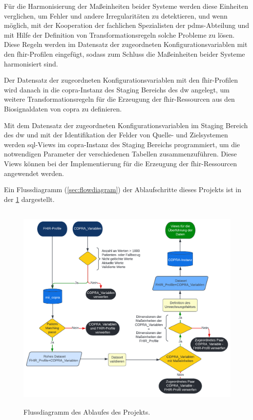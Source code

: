 Für die Harmonisierung der Maßeinheiten beider Systeme werden diese Einheiten verglichen, um Fehler und andere Irregularitäten zu detektieren, und wenn möglich, mit der Kooperation der fachlichen Spezialisten der \ac{pdms}-Abteilung und mit Hilfe der Definition von Transformationsregeln solche Probleme zu lösen. Diese Regeln werden im Datensatz der zugeordneten Konfigurationsvariablen mit den \ac{fhir}-Profilen eingefügt, sodass zum Schluss die Maßeinheiten beider Systeme harmonisiert sind.

Der Datensatz der zugeordneten Konfigurationsvariablen mit den \ac{fhir}-Profilen wird danach in die \ac{copra}-Instanz des Staging Bereichs des \ac{dw} angelegt, um weitere Transformationsregeln für die Erzeugung der \ac{fhir}-Ressourcen aus den Biosignaldaten von \ac{copra} zu definieren.

Mit dem Datensatz der zugeordneten Konfigurationsvariablen im Staging Bereich des \ac{dw} und mit der Identifikation der Felder von Quelle- und Zielsystemen werden \ac{sql}-Views im \ac{copra}-Instanz des Staging Bereichs programmiert, um die notwendigen Parameter der verschiedenen Tabellen zusammenzuführen. Diese Views können bei der Implementierung für die Erzeugung der \ac{fhir}-Ressourcen angewendet werden.

Ein Flussdiagramm (\ref{sec:flowdiagram}) der Ablaufschritte dieses Projekts ist in der \ref{fig:flowdiagram} dargestellt.

\clearpage

\begin{figure}[ht]
	\centering
	\includegraphics[height=10.5cm]{figures/thesis_flow}
	\caption[Flussdiagramm des Ablaufes des Projekts]{Flussdiagramm des Ablaufes des Projekts.}
	\label{fig:flowdiagram}
\end{figure}